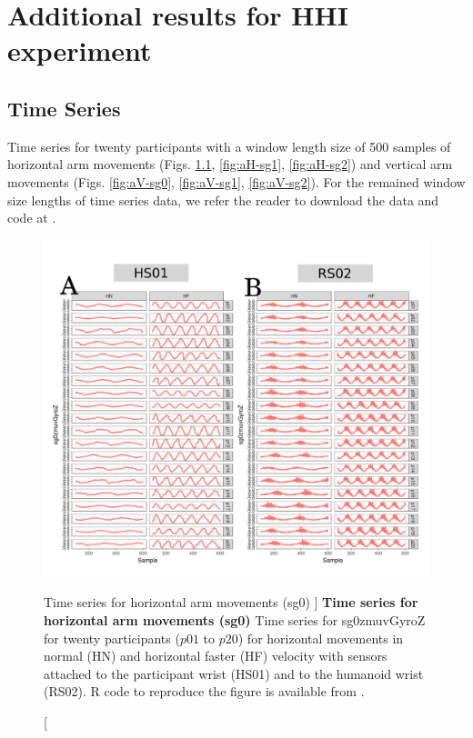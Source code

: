 \chapter{Additional results for HHI experiment} \label{appendix:e}

\graphicspath{{figs/appendixE/PDF/}}


\section{Time Series} \label{appendix:e:ts}

Time series for twenty participants with a window length size of 500 samples
of horizontal arm movements (Figs. \ref{fig:aH-sg0}, \ref{fig:aH-sg1}, \ref{fig:aH-sg2})
and vertical arm movements (Figs. \ref{fig:aV-sg0}, \ref{fig:aV-sg1}, \ref{fig:aV-sg2}).
For the remained window size lengths of time series data, we refer
the reader to download the data and code at \cite{hwum2018}.
\begin{figure}
\centering
\includegraphics[width=1.0\textwidth]{aH-sg0}
    	\caption
	[Time series for horizontal arm movements (sg0) ]{
	{\bf Time series for horizontal arm movements (sg0)}
		Time series for sg0zmuvGyroZ for twenty participants 
		($p01$ to  $p20$) 
		for horizontal movements in normal (HN) and horizontal faster (HF) 
		velocity with sensors attached to the participant wrist (HS01)
		and to the humanoid wrist (RS02).
	R code to reproduce the figure is available from \cite{hwum2018}.
        }
    \label{fig:aH-sg0}
\end{figure}

